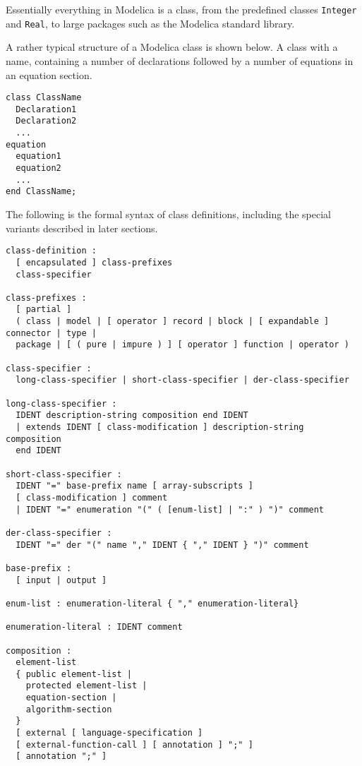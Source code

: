 Essentially everything in Modelica is a class, from the predefined
classes \lstinline!Integer! and \lstinline!Real!, to large packages such as the Modelica
standard library.

\begin{example}
A rather typical structure of a Modelica class is
shown below. A class with a name, containing a number of declarations
followed by a number of equations in an equation section.

\begin{lstlisting}[language=modelica]
class ClassName
  Declaration1
  Declaration2
  ...
equation
  equation1
  equation2
  ...
end ClassName;
\end{lstlisting}
\end{example}

The following is the formal syntax of class definitions, including the
special variants described in later sections.

\begin{lstlisting}[language=grammar]
class-definition :
  [ encapsulated ] class-prefixes
  class-specifier

class-prefixes :
  [ partial ]
  ( class | model | [ operator ] record | block | [ expandable ] connector | type |
  package | [ ( pure | impure ) ] [ operator ] function | operator )

class-specifier :
  long-class-specifier | short-class-specifier | der-class-specifier

long-class-specifier :
  IDENT description-string composition end IDENT
  | extends IDENT [ class-modification ] description-string composition
  end IDENT

short-class-specifier :
  IDENT "=" base-prefix name [ array-subscripts ]
  [ class-modification ] comment
  | IDENT "=" enumeration "(" ( [enum-list] | ":" ) ")" comment

der-class-specifier :
  IDENT "=" der "(" name "," IDENT { "," IDENT } ")" comment

base-prefix :
  [ input | output ]

enum-list : enumeration-literal { "," enumeration-literal}

enumeration-literal : IDENT comment

composition :
  element-list
  { public element-list |
    protected element-list |
    equation-section |
    algorithm-section
  }
  [ external [ language-specification ]
  [ external-function-call ] [ annotation ] ";" ]
  [ annotation ";" ]
\end{lstlisting}

